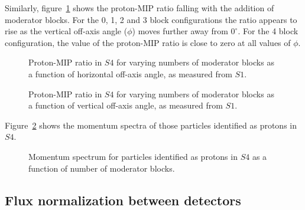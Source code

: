      Similarly, figure~\ref{fig:propiratio_s4_vert} shows the proton-MIP ratio falling with the addition of moderator blocks.
     For the 0, 1, 2 and 3 block configurations the ratio appears to rise as the vertical off-axis angle ($\phi$) moves further away from $0^{\circ}$. 
     For the 4 block configuration, the value of the proton-MIP ratio is close to zero at all values of $\phi$.
     
   	\begin{figure}[!ht]
   		\begin{minipage}[t]{0.48\textwidth}
   			\begin{adjustbox}{max totalsize={\textwidth}{.35\textheight}, center}
   				
   			\end{adjustbox}
   			\caption{Proton-MIP ratio in $S4$ for varying numbers of moderator blocks as a function of horizontal off-axis angle, as measured from $S1$.}
   			\label{fig:propiratio_s4_horz}
   		\end{minipage}
   		\hspace{0.3cm}
    	\begin{minipage}[t]{0.48\textwidth}
    		\begin{adjustbox}{max totalsize={\textwidth}{.35\textheight}, center}
	    		
	    	\end{adjustbox}
    		\caption{Proton-MIP ratio in $S4$ for varying numbers of moderator blocks as a function of vertical off-axis angle, as measured from $S1$.}
    		\label{fig:propiratio_s4_vert}
    	\end{minipage}	
   	\end{figure}
   
	Figure~\ref{fig:s4promom} shows the momentum spectra of those particles identified as protons in $S4$.
	
   	\begin{figure}[!ht]
   		\centering
   		\begin{adjustbox}{max totalsize={0.8\textwidth}, center}
   			
   		\end{adjustbox}
   		\caption{Momentum spectrum for particles identified as protons in $S4$ as a function of number of moderator blocks.}
   		\label{fig:s4promom}
   	\end{figure}
   
	\subsection{Flux normalization between detectors}
	
